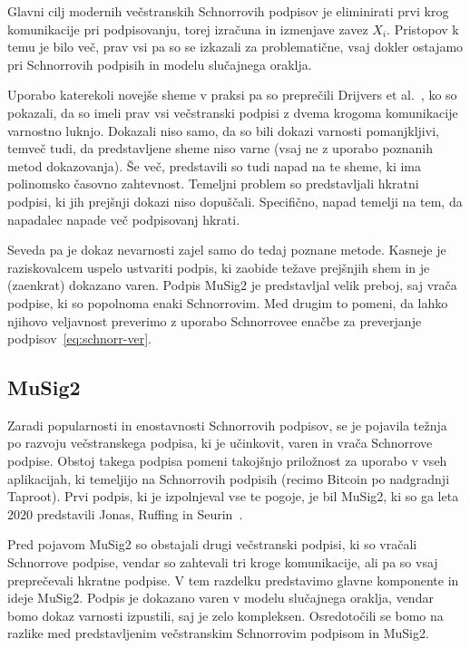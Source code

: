 \documentclass[isrm2, tisk]{fmfdelo}
\begin{document}
Glavni cilj modernih večstranskih Schnorrovih podpisov je eliminirati prvi krog komunikacije
pri podpisovanju, torej izračuna in izmenjave zavez $X_i$. Pristopov k temu je bilo več, prav vsi
pa so se izkazali za problematične, vsaj dokler ostajamo pri Schnorrovih podpisih in modelu
slučajnega oraklja.

Uporabo katerekoli novejše sheme v praksi pa so preprečili Drijvers et al.~\cite{drijvers2019security},
ko so pokazali, da so imeli prav vsi večstranski podpisi z dvema krogoma komunikacije varnostno
luknjo. Dokazali niso samo, da so bili dokazi varnosti pomanjkljivi, temveč tudi, da predstavljene
sheme niso varne (vsaj ne z uporabo poznanih metod dokazovanja). Še več, predstavili so tudi napad
na te sheme, ki ima polinomsko časovno zahtevnost. Temeljni problem so predstavljali hkratni podpisi,
ki jih prejšnji dokazi niso dopuščali. Specifično, napad temelji na tem, da napadalec napade več
podpisovanj hkrati.

Seveda pa je dokaz nevarnosti zajel samo do tedaj poznane metode. Kasneje je raziskovalcem uspelo
ustvariti podpis, ki zaobide težave prejšnjih shem in je (zaenkrat) dokazano varen. Podpis MuSig2
je predstavljal velik preboj, saj vrača podpise, ki so popolnoma enaki Schnorrovim. Med drugim to
pomeni, da lahko njihovo veljavnost preverimo z uporabo Schnorrovee enačbe za preverjanje
podpisov~\eqref{eq:schnorr-ver}.

\subsection{MuSig2}
\label{sec:musig2}
Zaradi popularnosti in enostavnosti Schnorrovih podpisov, se je pojavila težnja po razvoju večstranskega
podpisa, ki je učinkovit, varen in vrača Schnorrove podpise. Obstoj takega podpisa pomeni takojšnjo
priložnost za uporabo v vseh aplikacijah, ki temeljijo na Schnorrovih podpisih (recimo Bitcoin po
nadgradnji Taproot). Prvi podpis, ki je izpolnjeval vse te pogoje, je bil MuSig2, ki so ga leta $2020$
predstavili Jonas, Ruffing in Seurin~\cite{jonas2020musig2}.

Pred pojavom MuSig2 so obstajali drugi večstranski podpisi, ki so vračali Schnorrove podpise, vendar
so zahtevali tri kroge komunikacije, ali pa so vsaj preprečevali hkratne podpise. V tem razdelku
predstavimo glavne komponente in ideje MuSig2. Podpis je dokazano varen v modelu slučajnega oraklja,
vendar bomo dokaz varnosti izpustili, saj je zelo kompleksen. Osredotočili se bomo na razlike med
predstavljenim večstranskim Schnorrovim podpisom in MuSig2.
\end{document}
